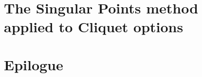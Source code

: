\documentclass[12pt,a4paper,oneside]{amsbook}
\begin{document}
\chapter[Cliquet options]{The Singular Points method applied to Cliquet options}
\label{cha:sp-cliquet}


\chapter{Epilogue}
\label{cha:epilogue}
%


\appendix


\backmatter

\printbibliography
\end{document}

